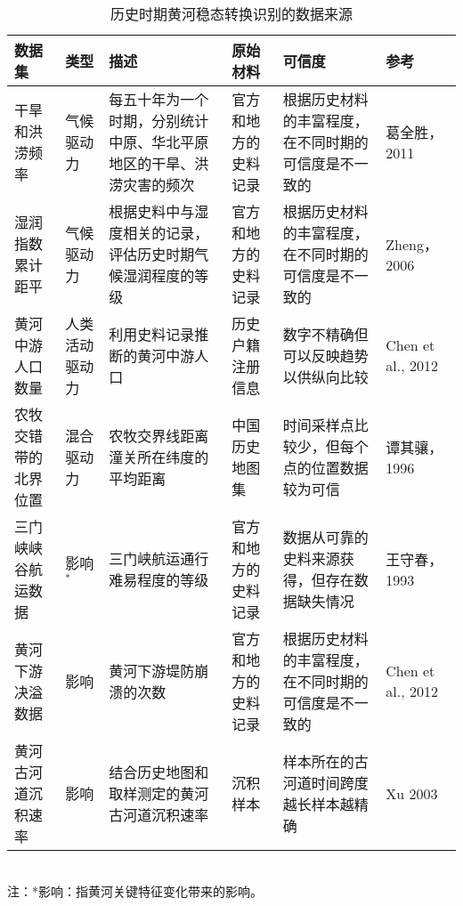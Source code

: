 \begin{table}[hbt]
  \caption{历史时期黄河稳态转换识别的数据来源}
    \begin{tabularx}{\textwidth}{ p{2cm} L p{5cm} L p{3cm} L}
    \toprule
    数据集   & 类型    & 描述    & 原始材料  & 可信度   & 参考 \\
    \midrule
    干旱和洪涝频率 & 气候驱动力 & 每五十年为一个时期，分别统计中原、华北平原地区的干旱、洪涝灾害的频次 & 官方和地方的史料记录 & 根据历史材料的丰富程度，在不同时期的可信度是不一致的 & 葛全胜，2011~\cite{GeQuanSheng2011} \\
    湿润指数累计距平 & 气候驱动力 & 根据史料中与湿度相关的记录，评估历史时期气候湿润程度的等级 & 官方和地方的史料记录 & 根据历史材料的丰富程度，在不同时期的可信度是不一致的 & Zheng，2006~\cite{zheng2006} \\
    黄河中游人口数量 & 人类活动驱动力 & 利用史料记录推断的黄河中游人口 & 历史户籍注册信息 & 数字不精确但可以反映趋势以供纵向比较 & Chen et al., 2012~\cite{chen2012} \\
    农牧交错带的北界位置 & 混合驱动力 & 农牧交界线距离潼关所在纬度的平均距离 & 中国历史地图集 & 时间采样点比较少，但每个点的位置数据较为可信 & 谭其骧，1996~\cite{TanQiXiang1996} \\
    三门峡峡谷航运数据 & 影响$^*$    & 三门峡航运通行难易程度的等级 & 官方和地方的史料记录 & 数据从可靠的史料来源获得，但存在数据缺失情况 & 王守春，1993~\cite{wang1993} \\
    黄河下游决溢数据 & 影响    & 黄河下游堤防崩溃的次数 & 官方和地方的史料记录 & 根据历史材料的丰富程度，在不同时期的可信度是不一致的 & Chen et al., 2012~\cite{chen2012} \\
    黄河古河道沉积速率 & 影响    & 结合历史地图和取样测定的黄河古河道沉积速率 & 沉积样本  & 样本所在的古河道时间跨度越长样本越精确 & Xu 2003~\cite{xu2003} \\
    \bottomrule
  \end{tabularx}\\[2pt]
  \footnotesize 注：*影响：指黄河关键特征变化带来的影响。\\\label{tab:data_source}%
\end{table}%
